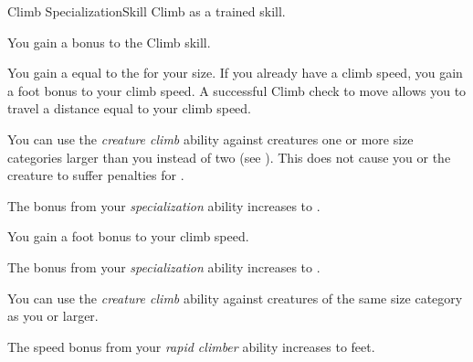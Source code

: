     \begin{feat}{Climb Specialization}{Skill}
        \featpre Climb as a trained skill.

         You gain a  bonus to the Climb skill.

         You gain a  equal to the  for your size.
        If you already have a climb speed, you gain a  foot bonus to your climb speed.
        A successful Climb check to move allows you to travel a distance equal to your climb speed.

         You can use the \textit{creature climb} ability against creatures one or more size categories larger than you instead of two (see ).
        This does not cause you or the creature to suffer penalties for \squeezing.

         The bonus from your \textit{specialization} ability increases to .

         You gain a  foot bonus to your climb speed.

         The bonus from your \textit{specialization} ability increases to .

         You can use the \textit{creature climb} ability against creatures of the same size category as you or larger.

         The speed bonus from your \textit{rapid climber} ability increases to  feet.
    \end{feat}

